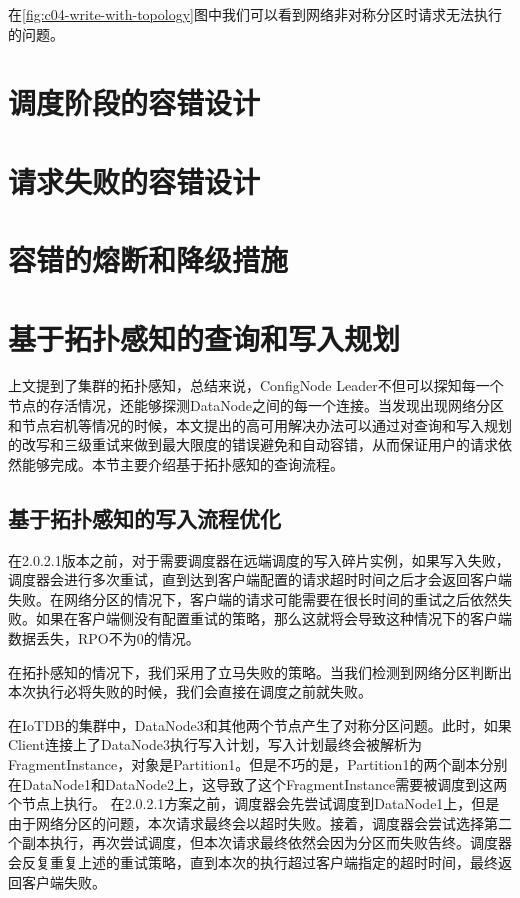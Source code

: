 在\ref{fig:c04-write-with-topology}图中我们可以看到网络非对称分区时请求无法执行的问题。




\section{调度阶段的容错设计}



\section{请求失败的容错设计}

\section{容错的熔断和降级措施}


\section{基于拓扑感知的查询和写入规划}
上文提到了集群的拓扑感知，总结来说，ConfigNode Leader不但可以探知每一个节点的存活情况，还能够探测DataNode之间的每一个连接。当发现出现网络分区和节点宕机等情况的时候，本文提出的高可用解决办法可以通过对查询和写入规划的改写和三级重试来做到最大限度的错误避免和自动容错，从而保证用户的请求依然能够完成。本节主要介绍基于拓扑感知的查询流程。



\subsection{基于拓扑感知的写入流程优化}

在2.0.2.1版本之前，对于需要调度器在远端调度的写入碎片实例，如果写入失败，调度器会进行多次重试，直到达到客户端配置的请求超时时间之后才会返回客户端失败。在网络分区的情况下，客户端的请求可能需要在很长时间的重试之后依然失败。如果在客户端侧没有配置重试的策略，那么这就将会导致这种情况下的客户端数据丢失，RPO不为0的情况。

在拓扑感知的情况下，我们采用了立马失败的策略。当我们检测到网络分区判断出本次执行必将失败的时候，我们会直接在调度之前就失败。


在IoTDB的集群中，DataNode3和其他两个节点产生了对称分区问题。此时，如果Client连接上了DataNode3执行写入计划，写入计划最终会被解析为FragmentInstance，对象是Partition1。但是不巧的是，Partition1的两个副本分别在DataNode1和DataNode2上，这导致了这个FragmentInstance需要被调度到这两个节点上执行。
在2.0.2.1方案之前，调度器会先尝试调度到DataNode1上，但是由于网络分区的问题，本次请求最终会以超时失败。接着，调度器会尝试选择第二个副本执行，再次尝试调度，但本次请求最终依然会因为分区而失败告终。调度器会反复重复上述的重试策略，直到本次的执行超过客户端指定的超时时间，最终返回客户端失败。


